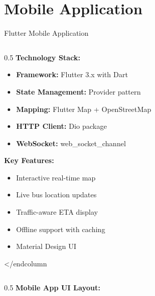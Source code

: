 \documentclass[aspectratio=169]{beamer}
\begin{document}
\section{Mobile Application}

\begin{frame}{Flutter Mobile Application}
    \begin{columns}
        \begin{column}{0.5\textwidth}
            \textbf{Technology Stack:}
            \begin{itemize}
                \item \textbf{Framework:} Flutter 3.x with Dart
                \item \textbf{State Management:} Provider pattern
                \item \textbf{Mapping:} Flutter Map + OpenStreetMap
                \item \textbf{HTTP Client:} Dio package
                \item \textbf{WebSocket:} web\_socket\_channel
            \end{itemize}
            
            \vspace{0.3cm}
            \textbf{Key Features:}
            \begin{itemize}
                \item Interactive real-time map
                \item Live bus location updates
                \item Traffic-aware ETA display
                \item Offline support with caching
                \item Material Design UI
            \end{itemize}
        </end{column}
        \begin{column}{0.5\textwidth}
            \textbf{Mobile App UI Layout:}
            \begin{center}
\end{center}
\end{column}
\end{column}
\end{columns}
\end{frame}
\end{document}
